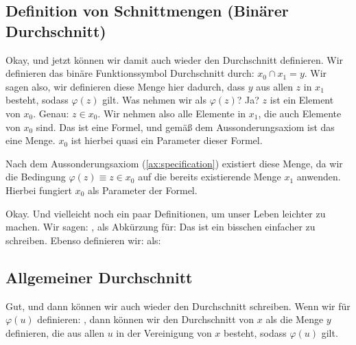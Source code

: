 \subsection{Definition von Schnittmengen (Binärer Durchschnitt)}
\begin{spoken-clean}[00:33:09 - 00:35:00]
Okay, und jetzt können wir damit auch wieder den Durchschnitt definieren. Wir definieren das binäre Funktionssymbol Durchschnitt durch: $x_0 \cap x_1 = y$. Wir sagen also, wir definieren diese Menge hier dadurch, dass $y$ aus allen $z$ in $x_1$ besteht, sodass $\varphi(z)$ gilt. Was nehmen wir als $\varphi(z)$? Ja? $z$ ist ein Element von $x_0$. Genau: $z \in x_0$. Wir nehmen also alle Elemente in $x_1$, die auch Elemente von $x_0$ sind. Das ist eine Formel, und gemäß dem Aussonderungsaxiom ist das eine Menge. $x_0$ ist hierbei quasi ein Parameter dieser Formel.
\end{spoken-clean}

\begin{math-stroke}
\begin{explanation-of-steps}
Nach dem Aussonderungsaxiom (\cref{ax:specification}) existiert diese Menge, da wir die Bedingung $\varphi(z) \equiv z \in x_0$ auf die bereits existierende Menge $x_1$ anwenden. Hierbei fungiert $x_0$ als Parameter der Formel.
\end{explanation-of-steps}
\end{math-stroke}

\begin{spoken-clean}[00:35:00 - 00:36:56]
Okay. Und vielleicht noch ein paar Definitionen, um unser Leben leichter zu machen. Wir sagen: , als Abkürzung für:  Das ist ein bisschen einfacher zu schreiben. Ebenso definieren wir:  als: 
\end{spoken-clean}

\subsection{Allgemeiner Durchschnitt}
\begin{spoken-clean}[continued]
Gut, und dann können wir auch wieder den Durchschnitt schreiben. Wenn wir für $\varphi(u)$ definieren: , dann können wir den Durchschnitt von $x$ als die Menge $y$ definieren, die aus allen $u$ in der Vereinigung von $x$ besteht, sodass $\varphi(u)$ gilt.
\end{spoken-clean}

